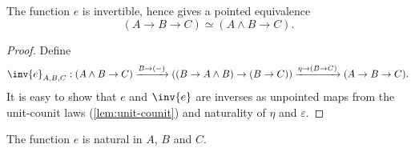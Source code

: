 \documentclass{article}
\newcommand{\pmap}{\to}
\newcommand{\lpmap}{\xrightarrow}
\newcommand{\smsh}{\wedge}
\renewcommand{\epsilon}{\varepsilon}
\renewcommand{\o}{\ensuremath{\circ}}
\begin{document}
\begin{lem}
  The function $e$ is invertible, hence gives a pointed equivalence $$(A\pmap B\pmap C)\simeq(A\smsh B\pmap C).$$
\end{lem}
\begin{proof}
  Define
  $$\inv{e}_{A,B,C}:(A\smsh B\pmap C)\lpmap{B\pmap({-})}((B\pmap A\smsh B)\pmap (B\pmap
  C))\lpmap{\eta\pmap(B\pmap C)}(A\pmap B\pmap C).$$ It is easy to show that $e$ and $\inv{e}$ are
  inverses as unpointed maps from the unit-counit laws (\autoref{lem:unit-counit}) and naturality of $\eta$ and $\epsilon$.
\end{proof}
\begin{lem}\label{lem:e-natural}
	The function $e$ is natural in $A$, $B$ and $C$.
\end{lem}
\end{document}

